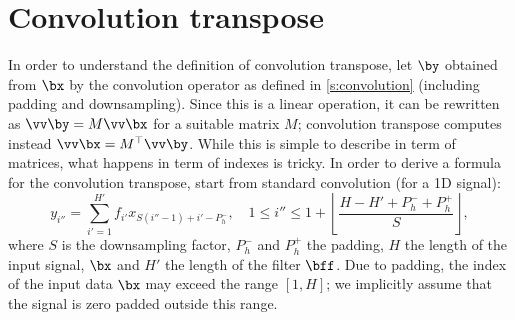 \section{Convolution transpose}\label{s:impl-convolution-transpose}

In order to understand the definition of convolution transpose, let $\by$ obtained from $\bx$ by the convolution operator as defined in \autoref{s:convolution} (including padding and downsampling).  Since this is a linear operation, it can be rewritten as $\vv \by = M \vv\bx$ for a suitable matrix $M$; convolution transpose computes instead $\vv \bx = M^\top \vv \by$.  While this is simple to describe in term of matrices, what happens in term of indexes is tricky. In order to derive a formula for the convolution transpose, start from standard convolution (for a 1D signal):
\[
   y_{i''} = \sum_{i'=1}^{H'} f_{i'} x_{S (i''-1) + i' - P_h^-}, 
   \quad
    1 \leq i'' \leq 1 + \left\lfloor \frac{H - H' + P_h^- + P_h^+}{S} \right\rfloor,
\]
where $S$ is the downsampling factor, $P_h^-$ and $P_h^+$ the padding, $H$ the length of the input signal, $\bx$ and $H'$ the length of the filter $\bff$. Due to padding, the index of the input data $\bx$ may exceed the range $[1,H]$; we implicitly assume that the signal is zero padded outside this range.

